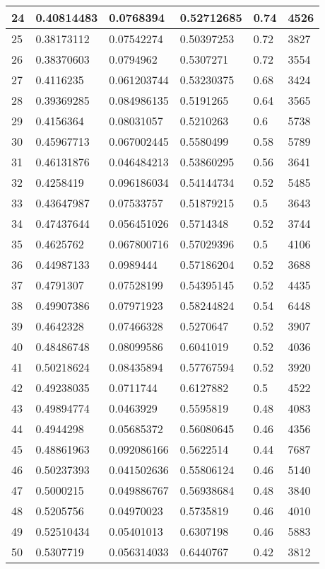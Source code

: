 \begin{longtable}{|l|l|l|l|l|l|}
24 & 0.40814483 & 0.0768394 & 0.52712685 & 0.74 & 4526 \\ \hline 
25 & 0.38173112 & 0.07542274 & 0.50397253 & 0.72 & 3827 \\ \hline 
26 & 0.38370603 & 0.0794962 & 0.5307271 & 0.72 & 3554 \\ \hline 
27 & 0.4116235 & 0.061203744 & 0.53230375 & 0.68 & 3424 \\ \hline 
28 & 0.39369285 & 0.084986135 & 0.5191265 & 0.64 & 3565 \\ \hline 
29 & 0.4156364 & 0.08031057 & 0.5210263 & 0.6 & 5738 \\ \hline 
30 & 0.45967713 & 0.067002445 & 0.5580499 & 0.58 & 5789 \\ \hline 
31 & 0.46131876 & 0.046484213 & 0.53860295 & 0.56 & 3641 \\ \hline 
32 & 0.4258419 & 0.096186034 & 0.54144734 & 0.52 & 5485 \\ \hline 
33 & 0.43647987 & 0.07533757 & 0.51879215 & 0.5 & 3643 \\ \hline 
34 & 0.47437644 & 0.056451026 & 0.5714348 & 0.52 & 3744 \\ \hline 
35 & 0.4625762 & 0.067800716 & 0.57029396 & 0.5 & 4106 \\ \hline 
36 & 0.44987133 & 0.0989444 & 0.57186204 & 0.52 & 3688 \\ \hline 
37 & 0.4791307 & 0.07528199 & 0.54395145 & 0.52 & 4435 \\ \hline 
38 & 0.49907386 & 0.07971923 & 0.58244824 & 0.54 & 6448 \\ \hline 
39 & 0.4642328 & 0.07466328 & 0.5270647 & 0.52 & 3907 \\ \hline 
40 & 0.48486748 & 0.08099586 & 0.6041019 & 0.52 & 4036 \\ \hline 
41 & 0.50218624 & 0.08435894 & 0.57767594 & 0.52 & 3920 \\ \hline 
42 & 0.49238035 & 0.0711744 & 0.6127882 & 0.5 & 4522 \\ \hline 
43 & 0.49894774 & 0.0463929 & 0.5595819 & 0.48 & 4083 \\ \hline 
44 & 0.4944298 & 0.05685372 & 0.56080645 & 0.46 & 4356 \\ \hline 
45 & 0.48861963 & 0.092086166 & 0.5622514 & 0.44 & 7687 \\ \hline 
46 & 0.50237393 & 0.041502636 & 0.55806124 & 0.46 & 5140 \\ \hline 
47 & 0.5000215 & 0.049886767 & 0.56938684 & 0.48 & 3840 \\ \hline 
48 & 0.5205756 & 0.04970023 & 0.5735819 & 0.46 & 4010 \\ \hline 
49 & 0.52510434 & 0.05401013 & 0.6307198 & 0.46 & 5883 \\ \hline 
50 & 0.5307719 & 0.056314033 & 0.6440767 & 0.42 & 3812 \\ \hline 
\end{longtable}